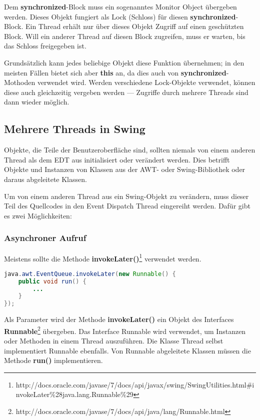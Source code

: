Dem \textbf{synchronized}-Block muss ein sogenanntes \glqq{}Monitor Object\grqq{} übergeben werden. Dieses Objekt fungiert als \glqq{}Lock\grqq{} (Schloss) für diesen \textbf{synchronized}-Block. Ein Thread erhält nur über dieses Objekt Zugriff auf einen geschützten Block. Will ein anderer Thread auf diesen Block zugreifen, muss er warten, bis das \glqq{}Schloss\grqq{} freigegeben ist.

Grundsätzlich kann jedes beliebige Objekt diese Funktion übernehmen; in den meisten Fällen bietet sich aber \textbf{this} an, da dies auch von \textbf{synchronized}-Mothoden verwendet wird. Werden verschiedene Lock-Objekte verwendet, können diese auch gleichzeitig vergeben werden --- Zugriffe durch mehrere Threads sind dann wieder möglich.

\subsection{Mehrere Threads in Swing}

Objekte, die Teile der Benutzeroberfläche sind, sollten niemals von einem anderen Thread  als dem EDT aus initialisiert oder verändert werden. Dies betrifft Objekte und Instanzen von Klassen aus der AWT- oder Swing-Bibliothek oder daraus abgeleitete Klassen.

Um von einem anderen Thread aus ein Swing-Objekt zu verändern, muss dieser Teil des Quellcodes in den Event Dispatch Thread eingereiht werden. Dafür gibt es zwei Möglichkeiten:

\subsubsection*{Asynchroner Aufruf}
Meistens sollte die Methode \textbf{invokeLater()}\footnote{http://docs.oracle.com/javase/7/docs/api/javax/swing/SwingUtilities.html\#invokeLater\%28java.lang.Runnable\%29} verwendet werden.
\begin{lstlisting}[language=JAVA]
java.awt.EventQueue.invokeLater(new Runnable() {
	public void run() {
		...
	}
});
\end{lstlisting}
	Als Parameter wird der Methode \textbf{invokeLater()} ein Objekt des Interfaces \textbf{Runnable}\footnote{http://docs.oracle.com/javase/7/docs/api/java/lang/Runnable.html} übergeben. Das Interface Runnable wird verwendet, um Instanzen oder Methoden in einem Thread auszuführen. Die Klasse Thread selbst implementiert Runnable ebenfalls. Von Runnable abgeleitete Klassen müssen die Methode \textbf{run()} implementieren.
	

